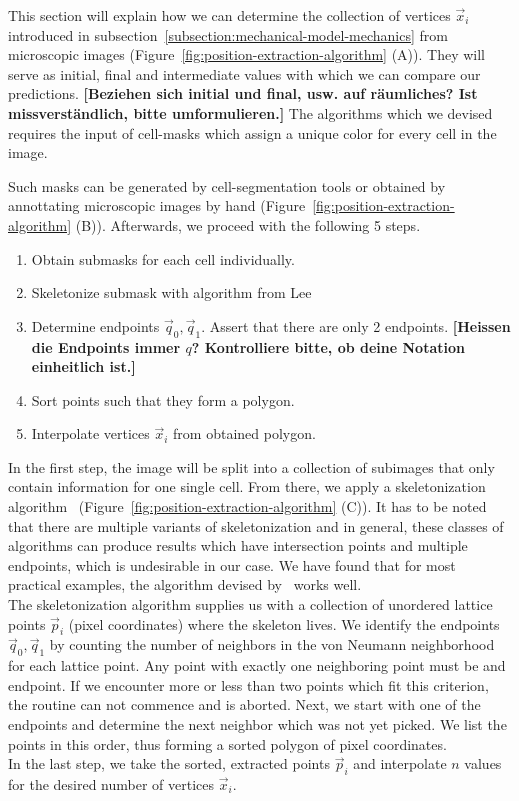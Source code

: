 \documentclass{article}
\begin{document}
This section will explain how we can determine the collection of vertices $\vec{x}_i$ introduced in
subsection~\ref{subsection:mechanical-model-mechanics} from microscopic images
(Figure~\ref{fig:position-extraction-algorithm} (A)).
They will serve as initial, final and intermediate values with which we can compare our predictions.
\textbf{[Beziehen sich initial und final, usw. auf räumliches? Ist missverständlich, bitte umformulieren.]}
The algorithms which we devised requires the input of cell-masks which assign a unique color for
every cell in the image.

Such masks can be generated by cell-segmentation tools or obtained by annottating microscopic images
by hand (Figure~\ref{fig:position-extraction-algorithm} (B)).
Afterwards, we proceed with the following 5 steps.
\begin{enumerate}
    \item Obtain submasks for each cell individually.
    \item Skeletonize submask with algorithm from Lee~\cite{Lee1994}
    \item Determine endpoints $\vec{q}_0,\vec{q}_1$.
        Assert that there are only 2 endpoints.
        \textbf{[Heissen die Endpoints immer $q$? Kontrolliere bitte, ob deine Notation einheitlich ist.]}
    \item Sort points such that they form a polygon.
    \item Interpolate vertices $\vec{x}_i$ from obtained polygon.
\end{enumerate}

In the first step, the image will be split into a collection of subimages that only contain
information for one single cell.
From there, we apply a skeletonization algorithm~\cite{Lee1994}
(Figure~\ref{fig:position-extraction-algorithm} (C)).
It has to be noted that there are multiple variants of skeletonization and in general, these classes
of algorithms can produce results which have intersection points and multiple endpoints, which is
undesirable in our case.
We have found that for most practical examples, the algorithm devised by~\cite{Lee1994} works well.\\

The skeletonization algorithm supplies us with a collection of unordered lattice points $\vec{p}_i$
(pixel coordinates) where the skeleton lives.
We identify the endpoints $\vec{q}_0,\vec{q}_1$ by counting the number of neighbors in the von
Neumann neighborhood for each lattice point.
Any point with exactly one neighboring point must be and endpoint.
If we encounter more or less than two points which fit this criterion, the routine can not commence
and is aborted.
Next, we start with one of the endpoints and determine the next neighbor which was not yet picked.
We list the points in this order, thus forming a sorted polygon of pixel coordinates.\\
In the last step, we take the sorted, extracted points $\vec{p}_i$ and interpolate $n$ values for
the desired number of vertices $\vec{x}_i$.
\end{document}
